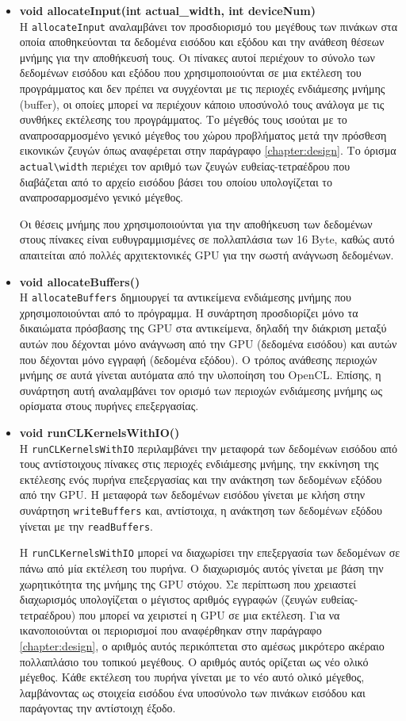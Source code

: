 \begin{itemize}
\item  \textbf{void allocateInput(int actual\_width, int deviceNum)}\\ 
Η \verb!allocateInput! αναλαμβάνει τον προσδιορισμό του μεγέθους των πινάκων στα οποία αποθηκεύονται τα δεδομένα εισόδου και εξόδου και την ανάθεση θέσεων μνήμης για την αποθήκευσή τους. Οι πίνακες αυτοί περιέχουν το σύνολο των δεδομένων εισόδου και εξόδου που χρησιμοποιούνται σε μια εκτέλεση του προγράμματος και δεν πρέπει να συγχέονται με τις περιοχές ενδιάμεσης μνήμης (buffer), οι οποίες μπορεί να περιέχουν κάποιο υποσύνολό τους ανάλογα με τις συνθήκες εκτέλεσης του προγράμματος. Το μέγεθός τους  ισούται με το αναπροσαρμοσμένο γενικό μέγεθος του χώρου προβλήματος μετά την πρόσθεση εικονικών ζευγών όπως αναφέρεται στην παράγραφο \ref{chapter:design}. Το όρισμα \verb!actual\width! περιέχει τον αριθμό των ζευγών ευθείας-τετραέδρου που διαβάζεται από το αρχείο εισόδου βάσει του οποίου υπολογίζεται το αναπροσαρμοσμένο γενικό μέγεθος. 

Οι θέσεις μνήμης που χρησιμοποιούνται για την αποθήκευση των δεδομένων στους πίνακες είναι ευθυγραμμισμένες σε πολλαπλάσια των 16 Byte, καθώς αυτό απαιτείται από πολλές αρχιτεκτονικές GPU για την σωστή ανάγνωση δεδομένων.

\item \textbf{void allocateBuffers()}\\ 
Η \verb!allocateBuffers! δημιουργεί τα αντικείμενα ενδιάμεσης μνήμης που χρησιμοποιούνται από το πρόγραμμα. Η συνάρτηση προσδιορίζει μόνο τα δικαιώματα πρόσβασης της GPU στα αντικείμενα, δηλαδή την διάκριση μεταξύ αυτών που δέχονται μόνο ανάγνωση από την GPU (δεδομένα εισόδου) και αυτών που δέχονται μόνο εγγραφή (δεδομένα εξόδου). Ο τρόπος ανάθεσης περιοχών μνήμης σε αυτά γίνεται αυτόματα από την υλοποίηση του OpenCL. Επίσης, η συνάρτηση αυτή αναλαμβάνει τον ορισμό των περιοχών ενδιάμεσης μνήμης ως ορίσματα στους πυρήνες επεξεργασίας.

\item \textbf{void runCLKernelsWithIO()}\\ 
Η \verb!runCLKernelsWithIO! περιλαμβάνει την μεταφορά των δεδομένων εισόδου από τους αντίστοιχους πίνακες στις περιοχές ενδιάμεσης μνήμης, την εκκίνηση της εκτέλεσης ενός πυρήνα επεξεργασίας και την ανάκτηση των δεδομένων εξόδου από την GPU. Η μεταφορά των δεδομένων εισόδου γίνεται με κλήση στην συνάρτηση \verb!writeBuffers! και, αντίστοιχα, η ανάκτηση των δεδομένων εξόδου γίνεται με την \verb!readBuffers!. 

Η \verb!runCLKernelsWithIO! μπορεί να διαχωρίσει την επεξεργασία των δεδομένων σε πάνω από μία εκτέλεση του πυρήνα. Ο διαχωρισμός αυτός γίνεται με βάση την χωρητικότητα της μνήμης της GPU στόχου. Σε περίπτωση που χρειαστεί διαχωρισμός υπολογίζεται ο μέγιστος αριθμός εγγραφών (ζευγών ευθείας-τετραέδρου) που μπορεί να χειριστεί η GPU σε μια εκτέλεση. Για να ικανοποιούνται οι περιορισμοί που αναφέρθηκαν στην παράγραφο \ref{chapter:design}, ο αριθμός αυτός περικόπτεται στο αμέσως μικρότερο ακέραιο πολλαπλάσιο του τοπικού μεγέθους. Ο αριθμός αυτός ορίζεται ως νέο ολικό μέγεθος. Κάθε εκτέλεση του πυρήνα γίνεται με το νέο αυτό ολικό μέγεθος, λαμβάνοντας ως στοιχεία εισόδου ένα υποσύνολο των πινάκων εισόδου και παράγοντας την αντίστοιχη έξοδο.


\end{itemize}
